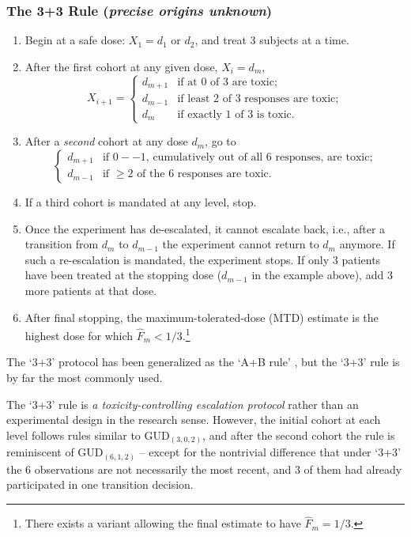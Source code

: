 \subsubsection{The 3+3 Rule (\emph{precise origins unknown})}
%
\begin{enumerate}
\item Begin at a safe dose: $X_1=d_1$ or $d_2$, and treat 3 subjects at a time.
\item After the first cohort at any given dose, $X_i=d_m$,
\begin{equation*}
X_{i+1}=
\begin{cases}
    d_{m+1} &\textrm{if at $0$ of $3$ are toxic;}\\
    d_{m-1} &\textrm{if least $2$ of $3$ responses are toxic;} \\
    d_m &\textrm{if exactly $1$ of $3$ is toxic.}
\end{cases}
\end{equation*}
\item After a \emph{second} cohort at any dose $d_m$, go to
\begin{equation*}
\begin{cases}
    d_{m+1} &\textrm{if $0--1$, cumulatively out of all $6$ responses, are toxic;}\\
    d_{m-1} &\textrm{if $\geq 2$ of the $6$ responses are toxic.}
\end{cases}
\end{equation*}
\item If a third cohort is mandated at any level, stop.
\item Once the experiment has de-escalated, it cannot escalate back, i.e., after a transition from $d_m$ to $d_{m-1}$ the experiment cannot return to $d_m$ anymore. If such a re-escalation is mandated, the experiment stops. If only $3$ patients have been treated at the stopping dose ($d_{m-1}$ in the example above), add $3$ more patients at that dose.
\item After final stopping, the maximum-tolerated-dose (MTD) estimate is the highest dose for which $\hat{F}_m<1/3$.\footnote{There exists a variant allowing the final estimate to have $\hat{F}_m=1/3$.}
\end{enumerate}
%
\noindent The `3+3' protocol has been generalized as the `A+B rule' \citep{Lin:Shih:stat:2001}, but the `3+3' rule is by far the most commonly used.

The `3+3' rule is \emph{a toxicity-controlling escalation protocol} rather than an experimental design in the research sense. However, the initial cohort at each level follows rules similar to GUD$_{(3,0,2)}$, and after the second cohort the rule is reminiscent of GUD$_{(6,1,2)}$ -- except for the nontrivial difference that under `3+3' the 6 observations are not necessarily the most recent, and 3 of them had already participated in one transition decision.

